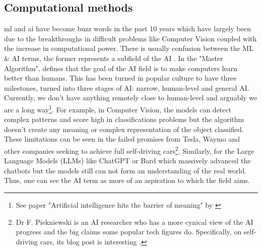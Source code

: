 \subsection{Computational methods} \label{s:lit:computational}

\vspace{3mm}
\vspace{3mm}

\acrfull{ml} and \acrfull{ai} have become buzz words in the past 10 years which have largely been due to the breakthroughs in difficult problems like Computer Vision\cite{Krizhevsky2012-qa} coupled with the increase in computational power. There is usually confusion between the ML \& AI terms, the former represents a subfield of the AI \cite{Domingos_Pedro2015-xr}. In the "Master Algorithm", \citet{Domingos_Pedro2015-xr} defines that the goal of the AI field is to make computers learn better than humans. This has been turned in popular culture to have three milestones, turned into three stages of AI: narrow, human-level and general AI. Currently, we don't have anything remotely close to human-level and arguably we are a long way\footnote{See paper "Artificial intelligence hits the barrier of meaning" by \citet{Mitchell2019-hv}}. For example, in Computer Vision, the models can detect complex patterns and score high in classifications problems but the algorithm doesn't create any meaning or complex representation of the object classified. These limitations can be seen in the failed promises from Tesla, Waymo and other companies seeking to achieve full self-driving cars\footnote{Dr F. Piekniewski is an AI researcher who has a more cynical view of the AI progress and the big claims some popular tech figures do. Specifically, on self-driving cars, its blog post is interesting \cite{Piekniewski2021-if}.}.  Similarly, for the Large Language Models (LLMs) like ChatGPT or Bard which massively advanced the chatbots but the models still can not form an understanding of the real world. Thus, one can see the AI term as more of an aspiration to which the field aims.

